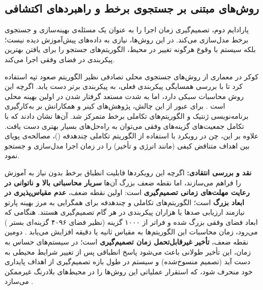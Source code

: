 \documentclass[oneside,openany,phd]{TMU-Thesis}
\begin{document}
\subsection{روش‌های مبتنی بر جستجوی برخط و راهبردهای اکتشافی}
\label{sec:ch3_search_based}

پارادایم دوم، تصمیم‌گیری زمان اجرا را به عنوان یک مسئله‌ی بهینه‌سازی و جستجوی برخط مدل‌سازی می‌کند. در این روش‌ها، نیازی به داده‌های پیش‌آموزش دیده نیست؛ بلکه سیستم با وقوع هرگونه تغییر در محیط، الگوریتم‌های جستجو را برای یافتن بهترین پیکربندی در فضای وفقی اجرا می‌کند.

کوکر در معماری  \cite{coker2015sass} از روش‌های جستجوی محلی تصادفی نظیر الگوریتم صعود تپه استفاده کرد تا با بررسی همسایگی پیکربندی فعلی، به پیکربندی برتر دست یابد. اگرچه این روش محاسبات سبکی دارد، اما به شدت مستعد گرفتار شدن در اولین بهینه محلی است \cite{coker2015sass}. برای عبور از این چالش، پژوهش‌های کینر و همکارانش \cite{kinneer2018managing, kinneer2020building, kinneer2021information} بر به‌کارگیری برنامه‌نویسی ژنتیک و الگوریتم‌های تکاملی برخط متمرکز شد. آن‌ها نشان دادند که با تکامل جمعیت‌های گزینه‌های وفقی می‌توان به راه‌حل‌های بسیار بهتری دست یافت. علاوه بر این، چن در رویکرد  \cite{chen2018femosaa} با استفاده از الگوریتم تکاملی چندهدفه ()، مصالحه‌ی پویای بین اهداف متناقض کیفی (مانند انرژی و تأخیر) را در زمان اجرا مدل‌سازی و جستجو نمود.

\textbf{نقد و بررسی انتقادی:}
اگرچه این رویکردها قابلیت انطباق برخط بدون نیاز به آموزش را فراهم می‌سازند، اما نقطه ضعف بزرگ آن‌ها \textbf{سربار محاسباتی بالا و ناتوانی در رعایت مهلت‌های زمانی تصمیم‌گیری} است:
اولین نقطه ضعف، \textbf{عدم مقیاس‌پذیری در ابعاد بزرگ} است؛ الگوریتم‌های تکاملی و چندهدفه برای همگرایی به مرز بهینه پارتو نیازمند ارزیابی صدها یا هزاران پیکربندی در هر گام تصمیم‌گیری هستند. هنگامی که ابعاد فضای وفقی بزرگ شده و فراتر از ۱۰۰۰ گزینه (نظیر فضای ۴۰۹۶ گزینه‌ای بستر ) می‌رود، زمان محاسبات این الگوریتم‌ها به مقیاس ثانیه یا دقیقه افزایش می‌یابد \cite{coker2015sass, kinneer2021information}. دومین نقطه ضعف، \textbf{تأخیر غیرقابل‌تحمل زمان تصمیم‌گیری} است؛ در سیستم‌های حساس به زمان، این تأخیر طولانی باعث می‌شود پاسخ انطباقی پس از تغییر شرایط محیطی به دست آید (تصمیم منسوخ‌شده) و سیستم در طول بازه تصمیم‌گیری از اهداف پایداری خود منحرف شود، که استقرار عملیاتی این روش‌ها را در محیط‌های بلادرنگ غیرممکن می‌سازد \cite{coker2015sass, kinneer2021information}.
\end{document}

